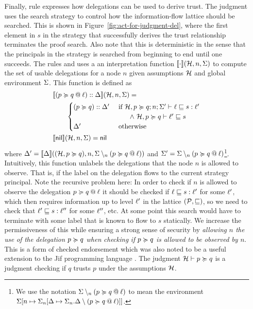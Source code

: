 Finally, rule  expresses how delegations can be used to derive trust. The judgment uses the search strategy to control how the information-flow lattice should be searched. This is shown in Figure~\ref{fig:act-for-judgment-del}, where the first element in $s$ in the strategy that successfully derives the trust relationship terminates the proof search. Also note that this is deterministic in the sense that the principals in the strategy is searched from beginning to end until one succeeds. The rules  and  uses a an interpretation function $\llbracket \cdot \rrbracket(\mathcal{H}, n, \Sigma)$ to compute the set of usable delegations for a node $n$ given assumptions $\mathcal{H}$ and global environment $\Sigma$. This function is defined as
\begin{align*}
&\llbracket (\lb{\level}{p \actsfor q}) :: \scope \rrbracket(\Assumps, n, \env) = \\ &\qquad  \begin{cases}
(p \actsfor q) :: \scope' & \text{ if } \flowstoquery{\Assumps, p \actsfor q; n; \env'}{\level}{s}{\level'} \\ &\qquad \wedge\ \nopostflowstoquery{\Assumps, p \actsfor q}{\level'}{s} \\
\scope' & \text{ otherwise}
\end{cases}
\\
&\llbracket \nil \rrbracket(\Assumps, n, \env) = \nil
\end{align*}
where $\Delta' = \llbracket \Delta \rrbracket((\mathcal{H}, p \succcurlyeq q), n, \Sigma \setminus_n (p \succcurlyeq q \mathbin{@} \ell))$ and $\Sigma' = \Sigma \setminus_n (p \succcurlyeq q \mathbin{@} \ell)$\footnote{We use the notation $\Sigma \setminus_n (p \succcurlyeq q \mathbin{@} \ell)$ to mean the environment $\Sigma \lbrack n \mapsto \Sigma_n \lbrack \Delta \mapsto \Sigma_n.\Delta \setminus (p \succcurlyeq q \mathbin{@} \ell) \rbrack \rbrack$.}. Intuitively, this function unlabels the delegations that the node $n$ is allowed to observe. That is, if the label on the delegation flows to the current strategy principal. Note the recursive problem here: In order to check if $n$ is allowed to observe the delegation $p \succcurlyeq q \mathbin{@} \ell$ it should be checked if $\ell \sqsubseteq s : \ell'$ for some $\ell'$, which then requires information up to level $\ell'$ in the lattice $(\mathcal{P}, \sqsubseteq)$, so we need to check that $\ell' \sqsubseteq s : \ell''$ for some $\ell''$, etc. At some point this search would have to terminate with some label that is known to flow to $s$ statically. We increase the permissiveness of this while ensuring a strong sense of security by \emph{allowing $n$ the use of the delegation $p \succcurlyeq q$ when checking if $p \succcurlyeq q$ is allowed to be observed by $n$}. This is a form of checked endorsement \cite{Cite Aslan's and Myers' ATTACKER CONTROL AND IMPACT FOR CONFIDENTIALITY AND INTEGRITY paper} which was also noted to be a useful extension to the Jif programming language \cite{Cite Stephen's Secure web applications via automatic partitioning}. The judgment $\mathcal{H} \vdash p \succcurlyeq q$ is a judgment checking if $q$ trusts $p$ under the assumptions $\mathcal{H}$. 

